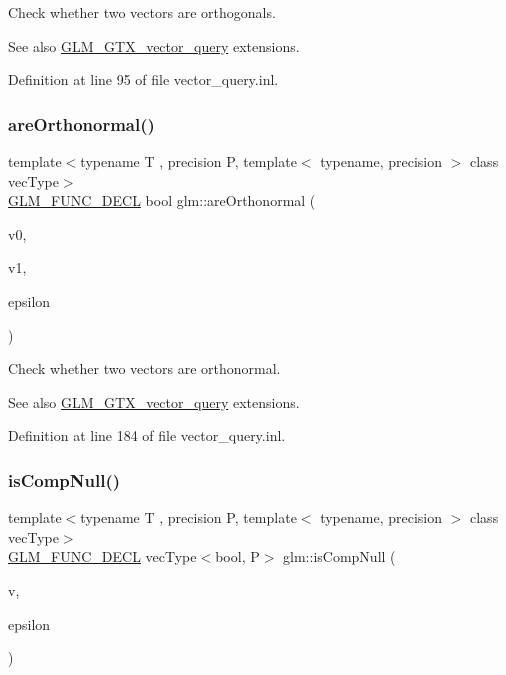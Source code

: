 Check whether two vectors are orthogonals. \begin{DoxySeeAlso}{See also}
\mbox{\hyperlink{group__gtx__vector__query}{G\+L\+M\+\_\+\+G\+T\+X\+\_\+vector\+\_\+query}} extensions. 
\end{DoxySeeAlso}


Definition at line 95 of file vector\+\_\+query.\+inl.

\mbox{\label{group__gtx__vector__query_ga89c82bc60e5b84e4489b74c15a134caf}} 
\subsubsection{\texorpdfstring{areOrthonormal()}{areOrthonormal()}}
{\footnotesize\ttfamily template$<$typename T , precision P, template$<$ typename, precision $>$ class vec\+Type$>$ \\
\mbox{\hyperlink{setup_8hpp_ab2d052de21a70539923e9bcbf6e83a51}{G\+L\+M\+\_\+\+F\+U\+N\+C\+\_\+\+D\+E\+CL}} bool glm\+::are\+Orthonormal (\begin{DoxyParamCaption}\item[{vec\+Type$<$ T, P $>$ const \&}]{v0,  }\item[{vec\+Type$<$ T, P $>$ const \&}]{v1,  }\item[{T const \&}]{epsilon }\end{DoxyParamCaption})}

Check whether two vectors are orthonormal. \begin{DoxySeeAlso}{See also}
\mbox{\hyperlink{group__gtx__vector__query}{G\+L\+M\+\_\+\+G\+T\+X\+\_\+vector\+\_\+query}} extensions. 
\end{DoxySeeAlso}


Definition at line 184 of file vector\+\_\+query.\+inl.

\mbox{\label{group__gtx__vector__query_ga93ecd4137480483ce1af0de8bbbf6546}} 
\subsubsection{\texorpdfstring{isCompNull()}{isCompNull()}}
{\footnotesize\ttfamily template$<$typename T , precision P, template$<$ typename, precision $>$ class vec\+Type$>$ \\
\mbox{\hyperlink{setup_8hpp_ab2d052de21a70539923e9bcbf6e83a51}{G\+L\+M\+\_\+\+F\+U\+N\+C\+\_\+\+D\+E\+CL}} vec\+Type$<$bool, P$>$ glm\+::is\+Comp\+Null (\begin{DoxyParamCaption}\item[{vec\+Type$<$ T, P $>$ const \&}]{v,  }\item[{T const \&}]{epsilon }\end{DoxyParamCaption})}

